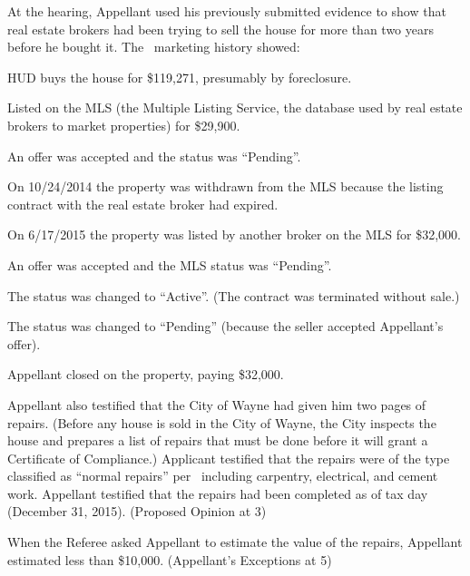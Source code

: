 \documentclass[12pt,\documentclassflag]{michiganCourtOfAppealsBrief}
\def\mathieuGast{\pincite[l]{MCL}{211.27(2)}}
\begin{document}
At the hearing, Appellant used his previously submitted evidence to show that real estate brokers had been trying to sell the house for more than two years before he bought it. The \MLS\ marketing history showed: 

\begin{description}[style=multiline,leftmargin=3cm,font=\normalfont,itemsep=.5\baselineskip,align=right]
\singlespacing 
\item[3/16/2005] HUD buys the house for \$119,271, presumably by foreclosure. 
\item[4/3/2013] Listed on the MLS (the Multiple Listing Service, the database used by real estate brokers to market properties) for \$29,900. 
\item[5/3/2013] An offer was accepted and the status was ``Pending''. 
\item[10/24/2013] On 10/24/2014 the property was withdrawn from the MLS because the listing contract with the real estate broker had expired. 
\item[6/17/2015] On 6/17/2015 the property was listed by another broker on the MLS for \$32,000. 
\item[6/29/2015] An offer was accepted and the MLS status was ``Pending''. 
\item[7/3/2015] The status was changed to ``Active''. (The contract was terminated without sale.) 
\item[7/6/2015] The status was changed to ``Pending'' (because the seller accepted Appellant's offer). 
\item[8/19/2015] Appellant closed on the property, paying \$32,000. 
\end{description}

Appellant also testified that the City of Wayne had given him two pages of repairs. (Before any house is sold in the City of Wayne, the City inspects the house and prepares a list of repairs that must be done before it will grant a Certificate of Compliance.) Applicant testified that the repairs were of the type classified as ``normal repairs'' per \mathieuGast\ including carpentry, electrical, and cement work. Appellant testified that the repairs had been completed as of tax day (December 31, 2015). (Proposed Opinion at 3)

When the Referee asked Appellant to estimate the value of the repairs, Appellant estimated less than \$10,000. (Appellant's Exceptions at 5)
\end{document}
